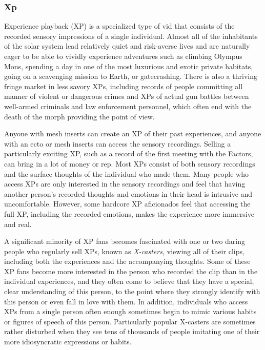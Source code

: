 \subsubsection{Xp}

Experience playback (XP) is a specialized type of vid 
that consists of the recorded sensory impressions of a 
single individual. Almost all of the inhabitants of the 
solar system lead relatively quiet and risk-averse lives 
and are naturally eager to be able to vividly experience 
adventures such as climbing Olympus Mons, spending 
a day in one of the most luxurious and exotic private 
habitats, going on a scavenging mission to Earth, or 
gatecrashing. There is also a thriving fringe market in 
less savory XPs, including records of people committing all manner of violent or dangerous crimes and 
XPs of actual gun battles between well-armed criminals and law enforcement personnel, which often end 
with the death of the morph providing the point of 
view.

Anyone with mesh inserts can create an XP of their 
past experiences, and anyone with an ecto or mesh 
inserts can access the sensory recordings. Selling a 
particularly exciting XP, such as a record of the first 
meeting with the Factors, can bring in a lot of money 
or rep. Most XPs consist of both sensory recordings 
and the surface thoughts of the individual who made 
them. Many people who access XPs are only interested in the sensory recordings and feel that having 
another person's recorded thoughts and emotions in 
their head is intrusive and uncomfortable. However, 
some hardcore XP aficionados feel that accessing the 
full XP, including the recorded emotions, makes the 
experience more immersive and real.

A significant minority of XP fans becomes fascinated with one or two daring people who regularly 
sell XPs, known as \textit{X-casters,} viewing all of their clips, 
including both the experiences and the accompanying 
thoughts. Some of these XP fans become more interested in the person who recorded the clip than in the 
individual experiences, and they often come to believe 
that they have a special, clear understanding of this 
person, to the point where they strongly identify with 
this person or even fall in love with them. In addition, 
individuals who access XPs from a single person often 
enough sometimes begin to mimic various habits or 
figures of speech of this person. Particularly popular 
X-casters are sometimes rather disturbed when they 
see tens of thousands of people imitating one of their 
more idiosyncratic expressions or habits.

